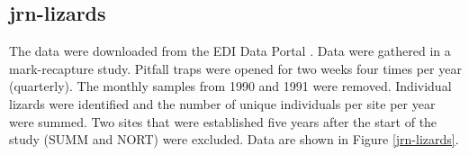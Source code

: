 \documentclass[11pt, oneside]{article}
\begin{document}
\subsection {jrn-lizards}
The data were downloaded from the EDI Data Portal \citep{jrn-lizard}.
Data were gathered in a mark-recapture study. 
Pitfall traps were opened for two weeks four times per year (quarterly). 
The monthly samples from 1990 and 1991 were removed.
Individual lizards were identified and the number of unique individuals per site per year were summed. 
Two sites that were established five years after the start of the study (SUMM and NORT) were excluded. 
Data are shown in Figure \ref{jrn-lizards}.
\end{document}

